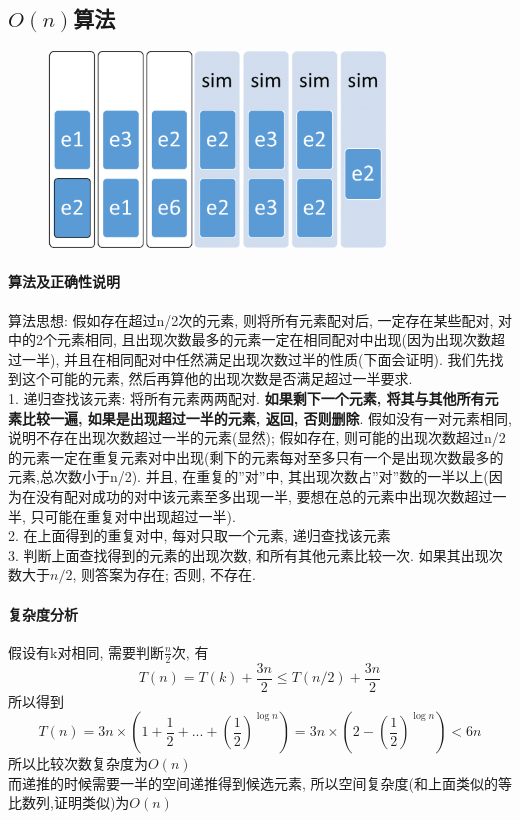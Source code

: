 \documentclass[a4paper,10pt]{article}
\begin{document}
  
  \subsection{$O(n)$算法}
  \begin{figure}[h]
  \centering
  \includegraphics[width=0.8\textwidth]{hw3_p1}
  \end{figure}
  \paragraph{算法及正确性说明}
  算法思想: 假如存在超过n/2次的元素, 则将所有元素配对后, 一定存在某些配对, 对中的2个元素相同, 且出现次数最多的元素一定在相同配对中出现(因为出现次数超过一半), 并且在相同配对中任然满足出现次数过半的性质(下面会证明). 我们先找到这个可能的元素, 然后再算他的出现次数是否满足超过一半要求.\\
  1. 递归查找该元素: 将所有元素两两配对. \textbf{如果剩下一个元素, 将其与其他所有元素比较一遍, 如果是出现超过一半的元素, 返回, 否则删除}. 假如没有一对元素相同, 说明不存在出现次数超过一半的元素(显然); 假如存在, 则可能的出现次数超过n/2的元素一定在重复元素对中出现(剩下的元素每对至多只有一个是出现次数最多的元素,总次数小于n/2). 并且, 在重复的''对''中, 其出现次数占''对''数的一半以上(因为在没有配对成功的对中该元素至多出现一半, 要想在总的元素中出现次数超过一半, 只可能在重复对中出现超过一半).\\
  2. 在上面得到的重复对中, 每对只取一个元素, 递归查找该元素\\
  3. 判断上面查找得到的元素的出现次数, 和所有其他元素比较一次. 如果其出现次数大于$n/2$, 则答案为存在; 否则, 不存在.
  \paragraph{复杂度分析}
  假设有k对相同, 需要判断$\frac{n}{2}$次, 有 
  $$T(n)=T(k)+\frac{3n}{2}\leq T(n/2)+\frac{3n}{2}$$
  所以得到$$T(n)=3n\times (1+\frac{1}{2}+...+(\frac{1}{2})^{\log n})=3n\times(2-(\frac{1}{2})^{\log n})<6n$$
  所以比较次数复杂度为$O(n)$\\
  而递推的时候需要一半的空间递推得到候选元素, 所以空间复杂度(和上面类似的等比数列,证明类似)为$O(n)$
  
\end{document}
